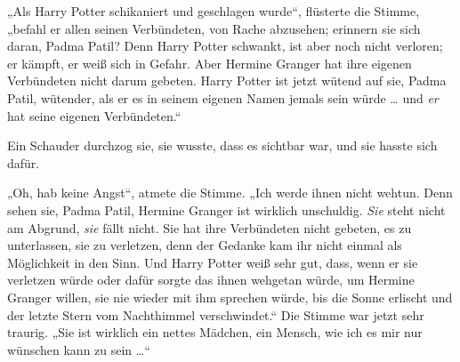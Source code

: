 „Als Harry Potter schikaniert und geschlagen wurde“, flüsterte die Stimme, „befahl er allen seinen Verbündeten, von Rache abzusehen; erinnern sie sich daran, Padma Patil? Denn Harry Potter schwankt, ist aber noch nicht verloren; er kämpft, er weiß sich in Gefahr. Aber Hermine Granger hat ihre eigenen Verbündeten nicht darum gebeten. Harry Potter ist jetzt wütend auf sie, Padma Patil, wütender, als er es in seinem eigenen Namen jemals sein würde … und \emph{er} hat seine eigenen Verbündeten.“

Ein Schauder durchzog sie, sie wusste, dass es sichtbar war, und sie hasste sich dafür.

„Oh, hab keine Angst“, atmete die Stimme.
„Ich werde ihnen nicht wehtun. Denn sehen sie, Padma Patil, Hermine Granger ist wirklich unschuldig. \emph{Sie} steht nicht am Abgrund, \emph{sie} fällt nicht. Sie hat ihre Verbündeten nicht gebeten, es zu unterlassen, sie zu verletzen, denn der Gedanke kam ihr nicht einmal als Möglichkeit in den Sinn. Und Harry Potter weiß sehr gut, dass, wenn er sie verletzen würde oder dafür sorgte das ihnen wehgetan würde, um Hermine Granger willen, sie nie wieder mit ihm sprechen würde, bis die Sonne erlischt und der letzte Stern vom Nachthimmel verschwindet.“ Die Stimme war jetzt sehr traurig.
„Sie ist wirklich ein nettes Mädchen, ein Mensch, wie ich es mir nur wünschen kann zu sein …“

